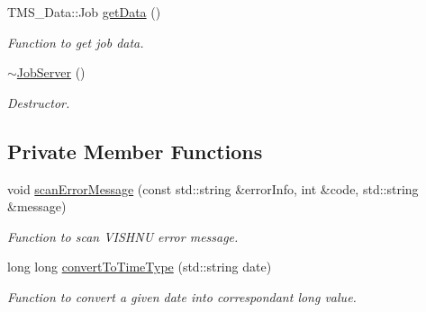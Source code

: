 \begin{DoxyCompactItemize}
TMS\_\-Data::Job \hyperlink{classJobServer_aa547d46ef7283e1b5d4ac9805b66479f}{getData} ()
\begin{DoxyCompactList}\small\item\em Function to get job data. \item\end{DoxyCompactList}\item 
\hypertarget{classJobServer_af74491ca82d110a87c204fd6e720191f}{
\hyperlink{classJobServer_af74491ca82d110a87c204fd6e720191f}{$\sim$JobServer} ()}
\label{classJobServer_af74491ca82d110a87c204fd6e720191f}

\begin{DoxyCompactList}\small\item\em Destructor. \item\end{DoxyCompactList}\end{DoxyCompactItemize}
\subsection*{Private Member Functions}
\begin{DoxyCompactItemize}
\item 
void \hyperlink{classJobServer_ae14cd2f9ba17ced6186b5b7c0a53a781}{scanErrorMessage} (const std::string \&errorInfo, int \&code, std::string \&message)
\begin{DoxyCompactList}\small\item\em Function to scan VISHNU error message. \item\end{DoxyCompactList}\item 
long long \hyperlink{classJobServer_a01467503a79019299b03e3903cb334c6}{convertToTimeType} (std::string date)
\begin{DoxyCompactList}\small\item\em Function to convert a given date into correspondant long value. \item\end{DoxyCompactList}\end{DoxyCompactItemize}
